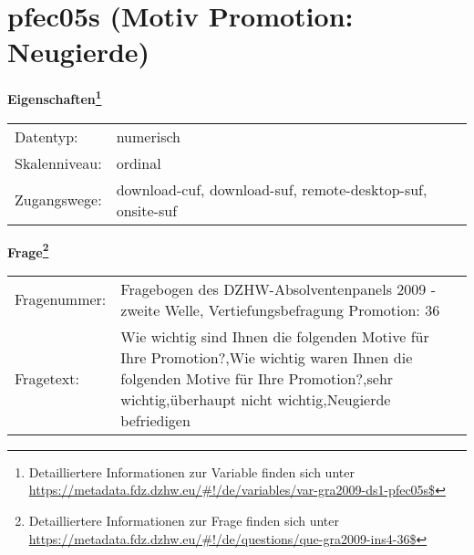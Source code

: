 
    \setcounter{footnote}{0}

    \vspace*{-1.8cm}
	\section{pfec05s (Motiv Promotion: Neugierde)}
	\label{section:pfec05s}



    \vspace*{0.5cm}
    \noindent\textbf{Eigenschaften\footnote{Detailliertere Informationen zur Variable finden sich unter
		\url{https://metadata.fdz.dzhw.eu/\#!/de/variables/var-gra2009-ds1-pfec05s$}}}\\
	\begin{tabularx}{\hsize}{@{}lX}
	Datentyp: & numerisch \\
	Skalenniveau: & ordinal \\
	Zugangswege: &
	  download-cuf, 
	  download-suf, 
	  remote-desktop-suf, 
	  onsite-suf
 \\
    \end{tabularx}



				\vspace*{0.5cm}
                \noindent\textbf{Frage\footnote{Detailliertere Informationen zur Frage finden sich unter
		              \url{https://metadata.fdz.dzhw.eu/\#!/de/questions/que-gra2009-ins4-36$}}}\\
				\begin{tabularx}{\hsize}{@{}lX}
					Fragenummer: &
					  Fragebogen des DZHW-Absolventenpanels 2009 - zweite Welle, Vertiefungsbefragung Promotion:
					  36
 \\
					Fragetext: & Wie wichtig sind Ihnen die folgenden Motive für Ihre Promotion?,Wie wichtig waren Ihnen die folgenden Motive für Ihre Promotion?,sehr wichtig,überhaupt nicht wichtig,Neugierde befriedigen \\
				\end{tabularx}





